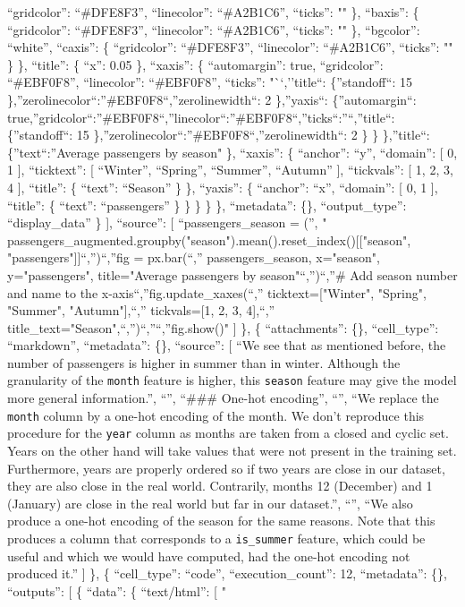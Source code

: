 \documentclass[
]{article}
\begin{document}
``gridcolor'': ``\#DFE8F3'', ``linecolor'': ``\#A2B1C6'', ``ticks'': ""
\}, ``baxis'': \{ ``gridcolor'': ``\#DFE8F3'', ``linecolor'':
``\#A2B1C6'', ``ticks'': "" \}, ``bgcolor'': ``white'', ``caxis'': \{
``gridcolor'': ``\#DFE8F3'', ``linecolor'': ``\#A2B1C6'', ``ticks'': ""
\} \}, ``title'': \{ ``x'': 0.05 \}, ``xaxis'': \{ ``automargin'': true,
``gridcolor'': ``\#EBF0F8'', ``linecolor'': ``\#EBF0F8'', ``ticks'':
"``,''title``: \{''standoff``: 15
\},''zerolinecolor``:''\#EBF0F8``,''zerolinewidth``: 2 \},''yaxis``:
\{''automargin``:
true,''gridcolor``:''\#EBF0F8``,''linecolor``:''\#EBF0F8``,''ticks``:''``,''title``:
\{''standoff``: 15 \},''zerolinecolor``:''\#EBF0F8``,''zerolinewidth``:
2 \} \} \},''title``: \{''text``:''Average passengers by season" \},
``xaxis'': \{ ``anchor'': ``y'', ``domain'': {[} 0, 1 {]}, ``ticktext'':
{[} ``Winter'', ``Spring'', ``Summer'', ``Autumn'' {]}, ``tickvals'':
{[} 1, 2, 3, 4 {]}, ``title'': \{ ``text'': ``Season'' \} \}, ``yaxis'':
\{ ``anchor'': ``x'', ``domain'': {[} 0, 1 {]}, ``title'': \{ ``text'':
``passengers'' \} \} \} \} \}, ``metadata'': \{\}, ``output\_type'':
``display\_data'' \} {]}, ``source'': {[} ``passengers\_season = (\n'',
"
passengers\_augmented.groupby("season").mean().reset\_index(){[}{[}"season",
"passengers"{]}{]}\n``,'')\n``,''fig = px.bar(\n``,''
passengers\_season, x="season", y="passengers", title="Average
passengers by season"\n``,'')\n``,''\# Add season number and name to the
x-axis\n``,''fig.update\_xaxes(\n``,'' ticktext={[}"Winter", "Spring",
"Summer", "Autumn"{]},\n``,'' tickvals={[}1, 2, 3, 4{]},\n``,''
title\_text="Season",\n``,'')\n``,''\n``,''fig.show()\n" {]} \}, \{
``attachments'': \{\}, ``cell\_type'': ``markdown'', ``metadata'': \{\},
``source'': {[} ``We see that as mentioned before, the number of
passengers is higher in summer than in winter. Although the granularity
of the \texttt{month} feature is higher, this \texttt{season} feature
may give the model more general information.\n'', ``\n'', ``\#\#\#
One-hot encoding\n'', ``\n'', ``We replace the \texttt{month} column by
a one-hot encoding of the month. We don't reproduce this procedure for
the \texttt{year} column as months are taken from a closed and cyclic
set. Years on the other hand will take values that were not present in
the training set. Furthermore, years are properly ordered so if two
years are close in our dataset, they are also close in the real world.
Contrarily, months 12 (December) and 1 (January) are close in the real
world but far in our dataset.\n'', ``\n'', ``We also produce a one-hot
encoding of the season for the same reasons. Note that this produces a
column that corresponds to a \texttt{is\_summer} feature, which could be
useful and which we would have computed, had the one-hot encoding not
produced it.\n'' {]} \}, \{ ``cell\_type'': ``code'',
``execution\_count'': 12, ``metadata'': \{\}, ``outputs'': {[} \{
``data'': \{ ``text/html'': {[} "
\end{document}
